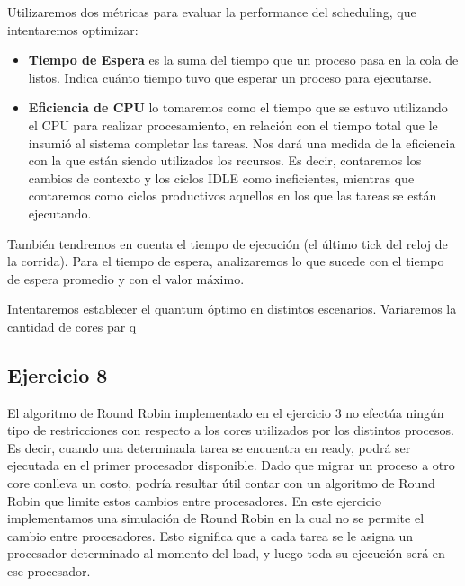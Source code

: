 \noindent
Utilizaremos dos métricas para evaluar la performance del scheduling, que intentaremos optimizar:
\begin{itemize}
	\item \textbf{Tiempo de Espera} es la suma del tiempo que un proceso pasa en la cola de listos. Indica cuánto tiempo tuvo que esperar un proceso para ejecutarse.
	\item \textbf{Eficiencia de CPU} lo tomaremos como el tiempo que se estuvo utilizando el CPU para realizar procesamiento, en relación con el tiempo total que le insumió al sistema completar las tareas. Nos dará una medida de la eficiencia con la que están siendo utilizados los recursos. Es decir, contaremos los cambios de contexto y los ciclos IDLE como ineficientes, mientras que contaremos como ciclos productivos aquellos en los que las tareas se están ejecutando.
\end{itemize}

Tambi\'en tendremos en cuenta el tiempo de ejecuci\'on (el \'ultimo tick del reloj de la corrida). Para el tiempo de espera, analizaremos lo que sucede con el tiempo de espera promedio y con el valor m\'aximo.

Intentaremos establecer el quantum \'optimo en distintos escenarios. Variaremos la cantidad de cores par q


\subsection{Ejercicio 8}

El algoritmo de Round Robin implementado en el ejercicio 3 no efectúa ningún tipo de restricciones con respecto a los cores utilizados por los distintos procesos. Es decir, cuando una determinada tarea se encuentra en ready, podrá ser ejecutada en el primer procesador disponible. Dado que migrar un proceso a otro core conlleva un costo, podría resultar útil contar con un algoritmo de Round Robin que limite estos cambios entre procesadores. En este ejercicio implementamos una simulación de Round Robin en la cual no se permite el cambio entre procesadores. Esto significa que a cada tarea se le asigna un procesador determinado al momento del load, y luego toda su ejecución será en ese procesador.\\

